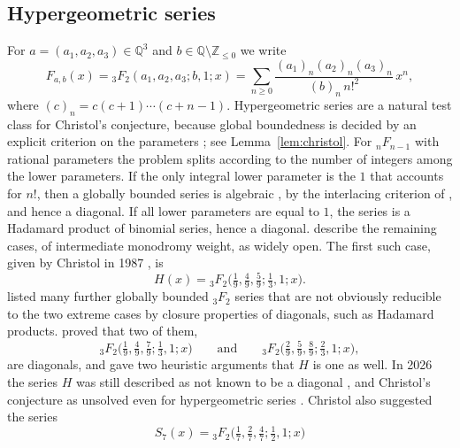\documentclass[11pt]{amsart}
\theoremstyle{definition}
\theoremstyle{remark}
\numberwithin{equation}{section}
\newcommand{\Q}{\mathbb{Q}}
\newcommand{\Z}{\mathbb{Z}}
\newcommand{\Fab}{F_{a,b}}
\begin{document}
\subsection{Hypergeometric series}
For $a=(a_1,a_2,a_3)\in\Q^3$ and $b\in\Q\setminus\Z_{\le0}$ we write
\begin{equation}\label{eq:Fab}
\Fab(x)={}_3F_2(a_1,a_2,a_3;b,1;x)=\sum_{n\ge0}\frac{(a_1)_n(a_2)_n(a_3)_n}{(b)_n\,n!^2}\,x^n ,
\end{equation}
where $(c)_n=c(c+1)\cdots(c+n-1)$. Hypergeometric series are a natural test class for Christol's conjecture, because global boundedness is decided by an explicit criterion on the parameters \citep{Christol1987}; see Lemma~\ref{lem:christol}. For ${}_nF_{n-1}$ with rational parameters the problem splits according to the number of integers among the lower parameters. If the only integral lower parameter is the $1$ that accounts for $n!$, then a globally bounded series is algebraic \citep[Theorem~33]{Christol2015}, by the interlacing criterion of \citet{BeukersHeckman1989}, and hence a diagonal. If all lower parameters are equal to $1$, the series is a Hadamard product of binomial series, hence a diagonal. \citet{BostanYurkevich2022} describe the remaining cases, of intermediate monodromy weight, as widely open. The first such case, given by Christol in 1987 \citep[\S VII]{Christol1987}, is
\begin{equation}\label{eq:H}
H(x)={}_3F_2\Big(\tfrac19,\tfrac49,\tfrac59;\tfrac13,1;x\Big).
\end{equation}
\citet{BostanEtAl2013} listed many further globally bounded ${}_3F_2$ series that are not obviously reducible to the two extreme cases by closure properties of diagonals, such as Hadamard products. \citet{AbdelazizKoutschanMaillard2020} proved that two of them,
\[
{}_3F_2\big(\tfrac19,\tfrac49,\tfrac79;\tfrac13,1;x\big)\qquad\text{and}\qquad{}_3F_2\big(\tfrac29,\tfrac59,\tfrac89;\tfrac23,1;x\big),
\]
are diagonals, and gave two heuristic arguments that $H$ is one as well. In 2026 the series $H$ was still described as not known to be a diagonal \citep{CarusoFurnsinn2026b}, and Christol's conjecture as unsolved even for hypergeometric series \citep{CarusoFurnsinn2026a}. Christol also suggested the series
\begin{equation}\label{eq:S7}
S_7(x)={}_3F_2\Big(\tfrac17,\tfrac27,\tfrac47;\tfrac12,1;x\Big)
\end{equation}
\end{document}
